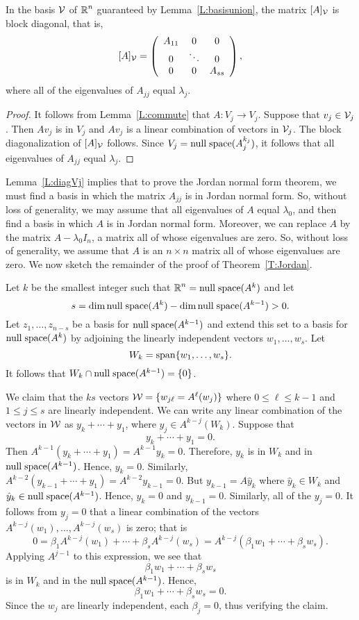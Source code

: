 \documentclass{ximera}
\begin{document}
\begin{lemma} \label{L:diagVj}
In the basis ${\cal V}$ of $\mbox{$\Bbb{R}$}^n$ guaranteed by Lemma~\ref{L:basisunion}, the 
matrix $[A]_{\cal V}$ is block diagonal, that is,
\[
[A]_{\cal V} = \left(\begin{array}{ccc} A_{11} & 0 & 0  \\ 0 & \ddots & 0 \\
0 & 0 & A_{ss} \end{array}\right),
\]
where all of the eigenvalues of $A_{jj}$ equal $\lambda_j$.
\end{lemma}

\begin{proof}  It follows from Lemma~\ref{L:commute} that $A:V_j\to V_j$.  Suppose
that $v_j\in {\cal V}_j$.   Then $Av_j$ is in $V_j$ and $Av_j$ is a linear
combination of vectors in ${\cal V}_j$.   The block diagonalization of 
$[A]_{\cal V}$ follows.  Since $V_j={\rm null\;space}(A_j^{k_j})$, it follows that all
eigenvalues of $A_{jj}$ equal $\lambda_j$.   \end{proof}

Lemma~\ref{L:diagVj} implies that to prove the Jordan normal form theorem, 
we must find a basis in which the matrix $A_{jj}$ is in Jordan normal form.  
So, without loss of generality, we may assume that all eigenvalues of $A$ 
equal $\lambda_0$, and then find a basis in which $A$ is in Jordan normal 
form.  Moreover, we can replace $A$ by the matrix $A-\lambda_0I_n$, a
matrix all of whose eigenvalues are zero.  So, without loss of generality, we 
assume that $A$ is an $n\times n$ matrix all of whose eigenvalues are zero.  
We now sketch the remainder of the proof of Theorem~\ref{T:Jordan}.

Let $k$ be the smallest integer such that $\mbox{$\Bbb{R}$}^n = {\rm null\;space}(A^k)$ and let 
\[
s=\dim{\rm null\;space}(A^k)-\dim{\rm null\;space}(A^{k-1})>0.
\]
Let $z_1,\ldots,z_{n-s}$ be 
a basis for ${\rm null\;space}(A^{k-1})$ and extend this set to a basis for 
${\rm null\;space}(A^k)$ by adjoining the linearly independent vectors $w_1,\ldots,w_s$.  
Let 
\[
W_k={\rm span}\{w_1,\ldots,w_s\}.
\]
It follows that $W_k\cap{\rm null\;space}(A^{k-1})=\{0\}$.  

We claim that the $ks$ vectors ${\cal W}=\{w_{j\ell}=A^\ell(w_j)\}$ where 
$0\le\ell\le {k-1}$ and $1\le j\le s$ are linearly independent.  We can write 
any linear combination of the vectors in ${\cal W}$ as $y_k+\cdots+y_1$, 
where $y_j\in A^{k-j}(W_k)$.  Suppose that 
\[
y_k+\cdots+y_1=0.
\]
Then $A^{k-1}(y_k+\cdots+y_1)= A^{k-1}y_k=0$.  Therefore, $y_k$ is in $W_k$ 
and in ${\rm null\;space}(A^{k-1})$.  Hence, $y_k=0$.  Similarly, 
$A^{k-2}(y_{k-1}+\cdots+y_1)= A^{k-2}y_{k-1}=0$.  But $y_{k-1}=A\hat{y}_k$ 
where $\hat{y}_k\in W_k$ and $\hat{y}_k\in{\rm null\;space}(A^{k-1})$.  Hence, 
$\hat{y}_k=0$ and $y_{k-1}=0$.  Similarly, all of the $y_j=0$.  It follows 
from $y_j=0$ that a linear combination of the vectors 
$A^{k-j}(w_1),\ldots,A^{k-j}(w_s)$ is zero; that is
\[
0 = \beta_1A^{k-j}(w_1) + \cdots + \beta_sA^{k-j}(w_s) =
A^{k-j}(\beta_1w_1+\cdots+\beta_sw_s).
\]
Applying  $A^{j-1}$ to this expression, we see that 
\[
\beta_1w_1+\cdots+\beta_sw_s
\]
is in $W_k$ and in the ${\rm null\;space}(A^{k-1})$.  Hence, 
\[
\beta_1w_1+\cdots+\beta_sw_s = 0.
\]
Since the $w_j$ are linearly independent, each $\beta_j=0$, thus verifying 
the claim.
\end{document}
